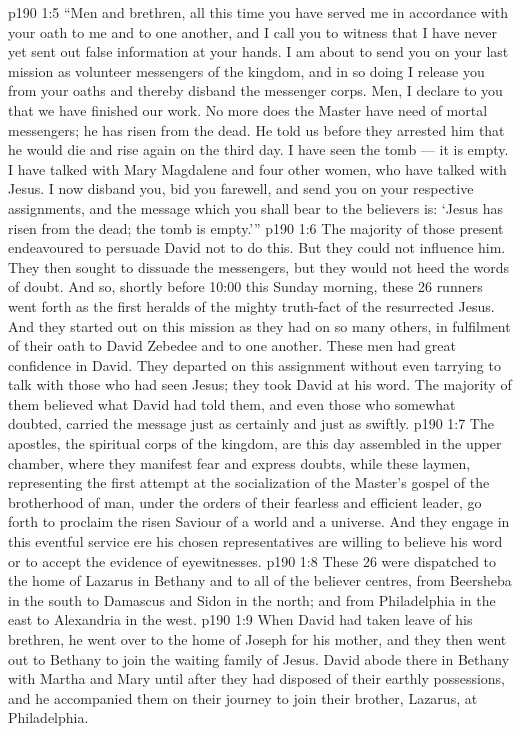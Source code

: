 \vs p190 1:5 \pc “Men and brethren, all this time you have served me in accordance with your oath to me and to one another, and I call you to witness that I have never yet sent out false information at your hands. I am about to send you on your last mission as volunteer messengers of the kingdom, and in so doing I release you from your oaths and thereby disband the messenger corps. Men, I declare to you that we have finished our work. No more does the Master have need of mortal messengers; he has risen from the dead. He told us before they arrested him that he would die and rise again on the third day. I have seen the tomb --- it is empty. I have talked with Mary Magdalene and four other women, who have talked with Jesus. I now disband you, bid you farewell, and send you on your respective assignments, and the message which you shall bear to the believers is: ‘Jesus has risen from the dead; the tomb is empty.’”
\vs p190 1:6 \pc The majority of those present endeavoured to persuade David not to do this. But they could not influence him. They then sought to dissuade the messengers, but they would not heed the words of doubt. And so, shortly before 10:00 this Sunday morning, these 26 runners went forth as the first heralds of the mighty truth\hyp{}fact of the resurrected Jesus. And they started out on this mission as they had on so many others, in fulfilment of their oath to David Zebedee and to one another. These men had great confidence in David. They departed on this assignment without even tarrying to talk with those who had seen Jesus; they took David at his word. The majority of them believed what David had told them, and even those who somewhat doubted, carried the message just as certainly and just as swiftly.
\vs p190 1:7 \pc The apostles, the spiritual corps of the kingdom, are this day assembled in the upper chamber, where they manifest fear and express doubts, while these laymen, representing the first attempt at the socialization of the Master’s gospel of the brotherhood of man, under the orders of their fearless and efficient leader, go forth to proclaim the risen Saviour of a world and a universe. And they engage in this eventful service ere his chosen representatives are willing to believe his word or to accept the evidence of eyewitnesses.
\vs p190 1:8 \pc These 26 were dispatched to the home of Lazarus in Bethany and to all of the believer centres, from Beersheba in the south to Damascus and Sidon in the north; and from Philadelphia in the east to Alexandria in the west.
\vs p190 1:9 When David had taken leave of his brethren, he went over to the home of Joseph for his mother, and they then went out to Bethany to join the waiting family of Jesus. David abode there in Bethany with Martha and Mary until after they had disposed of their earthly possessions, and he accompanied them on their journey to join their brother, Lazarus, at Philadelphia.
